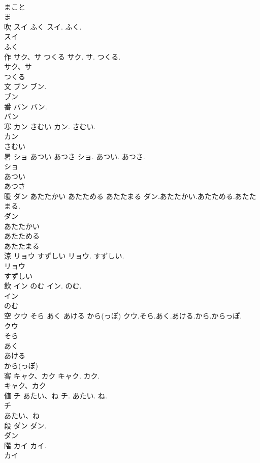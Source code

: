 \documentclass[8pt]{extreport}
\begin{document}
\begin{CJK}{UTF8}{min}
\\	まこと
\\	ま
\\	吹	スイ ふく	スイ. ふく.	
\\	スイ
\\	ふく
\\	作	サク、サ つくる	サク. サ. つくる.	
\\	サク、サ
\\	つくる
\\	文	ブン	ブン.	
\\	ブン
\\	番	バン	バン.	
\\	バン
\\	寒	カン さむい	カン. さむい.	
\\	カン
\\	さむい
\\	暑	ショ あつい あつさ	ショ. あつい. あつさ.	
\\	ショ
\\	あつい
\\	あつさ
\\	暖	ダン あたたかい あたためる あたたまる	ダン.あたたかい.あたためる.あたたまる.	
\\	ダン
\\	あたたかい
\\	あたためる
\\	あたたまる
\\	涼	リョウ すずしい	リョウ. すずしい.	
\\	リョウ
\\	すずしい
\\	飲	イン のむ	イン. のむ.	
\\	イン
\\	のむ
\\	空	クウ そら あく あける から(っぽ)	クウ.そら.あく.あける.から.からっぽ.	
\\	クウ
\\	そら
\\	あく
\\	あける
\\	から(っぽ)
\\	客	キャク、カク	キャク. カク.	
\\	キャク、カク
\\	値	チ あたい、ね	チ. あたい. ね.	
\\	チ
\\	あたい、ね
\\	段	ダン	ダン.	
\\	ダン
\\	階	カイ	カイ.	
\\	カイ

\end{CJK}
\end{document}
